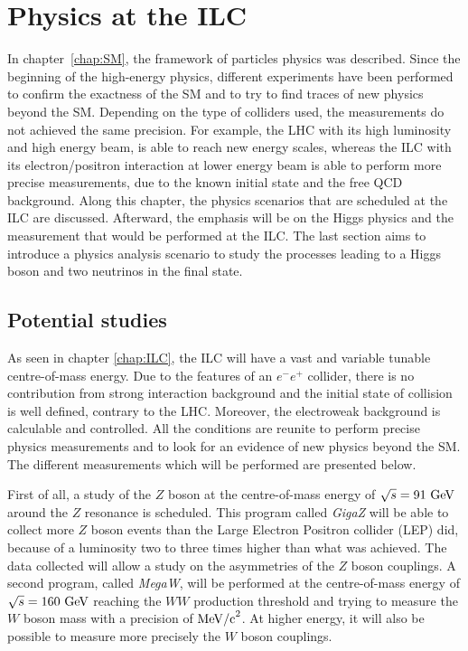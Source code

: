 \chapter{Physics at the ILC}
\label{chap:phyics}

  In chapter~\ref{chap:SM}, the framework of particles physics was described. 
  Since the beginning of the high-energy physics, different experiments have been performed to confirm the exactness of the \acrfull{SM} and to try to find traces of new physics beyond the \gls{SM}.
  Depending on the type of colliders used, the measurements do not achieved the same precision. 
  For example, the \gls{LHC} with its high luminosity and high energy beam, is able to reach new energy scales, whereas the \gls{ILC} with its electron/positron interaction at lower energy beam is able to perform more precise measurements, due to the known initial state and the free \gls{QCD} background. 
  Along this chapter, the physics scenarios that are scheduled at the \gls{ILC} are discussed. 
  Afterward, the emphasis will be on the Higgs physics and the measurement that would be performed at the \gls{ILC}. 
  The last section aims to introduce a physics analysis scenario to study the processes leading to a Higgs boson and two neutrinos in the final state.
 
 \minitoc

  \section{Potential studies}

  As seen in chapter \ref{chap:ILC}, the \gls{ILC} will have a vast and variable tunable centre-of-mass energy.
  Due to the features of an $e^-e^+$ collider, there is no contribution from strong interaction background and the initial state of collision is well defined, contrary to the \gls{LHC}.
  Moreover, the electroweak background is calculable and controlled.
  All the conditions are reunite to perform precise physics measurements and to look for an evidence of new physics beyond the \gls{SM}.
  The different measurements which will be performed are presented below.

   First of all, a study of the $Z$ boson at the centre-of-mass energy of $\sqrt{s} = 91~\rm{GeV}$ around the $Z$ resonance is scheduled. 
   This program called \textit{GigaZ} will be able to collect more $Z$ boson events than the Large Electron Positron collider (LEP) did, because of a luminosity two to three times higher than what was achieved. 
   The data collected will allow a study on the asymmetries of the $Z$ boson couplings. 
   A second program, called \textit{MegaW}, will be performed at the centre-of-mass energy of $\sqrt{s} = 160~\rm{GeV}$ reaching the $WW$ production threshold and trying to measure the $W$ boson mass with a precision of $\rm{MeV/c}^2$.
   At higher energy, it will also be possible to measure more precisely the $W$ boson couplings.

